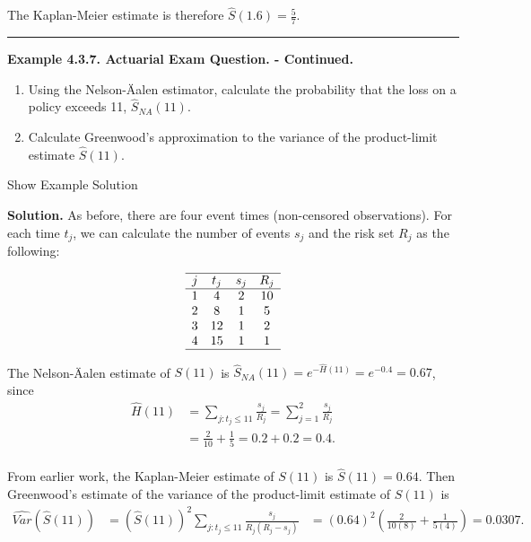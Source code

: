 \documentclass[]{book}
\providecommand{\tightlist}{%
  \setlength{\itemsep}{0pt}\setlength{\parskip}{0pt}}
\theoremstyle{definition}
\theoremstyle{definition}
\theoremstyle{definition}
\theoremstyle{remark}
\begin{document}
The Kaplan-Meier estimate is therefore \(\hat{S}(1.6) = \frac{5}{7}\).

\begin{center}\rule{0.5\linewidth}{\linethickness}\end{center}

\textbf{Example 4.3.7. Actuarial Exam Question. - Continued.}

\begin{enumerate}
\def\labelenumi{\alph{enumi})}
\tightlist
\item
  Using the Nelson-Äalen estimator, calculate the probability that the
  loss on a policy exceeds 11, \(\hat{S}_{NA}(11)\).
\item
  Calculate Greenwood's approximation to the variance of the
  product-limit estimate \(\hat{S}(11)\).
\end{enumerate}

Show Example Solution

\hypertarget{toggleExampleSelect.3.7}{}
\textbf{Solution.} As before, there are four event times (non-censored
observations). For each time \(t_j\), we can calculate the number of
events \(s_j\) and the risk set \(R_j\) as the following:

\[\begin{array}{cccc}
\hline
j & t_j & s_j & R_j \\
\hline
1 & 4 & 2 & 10 \\
2 & 8 & 1 & 5 \\
3 & 12 & 1 & 2 \\
4 & 15 & 1 & 1 \\
\hline
\end{array}\]

The Nelson-Äalen estimate of \(S(11)\) is
\(\hat{S}_{NA}(11)=e^{-\hat{H}(11)} = e^{-0.4} = 0.67\), since
\[\begin{aligned}
\hat{H}(11) &= \sum_{j:t_j\leq 11} \frac{s_j}{R_j}  = \sum_{j=1}^{2} \frac{s_j}{R_j}  \\
&= \frac{2}{10} + \frac{1}{5}  = 0.2 + 0.2 = 0.4 .\\
\end{aligned}\]

From earlier work, the Kaplan-Meier estimate of \(S(11)\) is
\(\hat{S}(11) = 0.64\). Then Greenwood's estimate of the variance of the
product-limit estimate of \(S(11)\) is \[\begin{aligned}
\widehat{Var}(\hat{S}(11)) &= (\hat{S}(11))^2 \sum_{j:t_j\leq 11} \frac{s_j}{R_j(R_j-s_j)}
&= (0.64)^2 \left(\frac{2}{10(8)} + \frac{1}{5(4)} \right)  = 0.0307. \\
\end{aligned}\]
\end{document}

